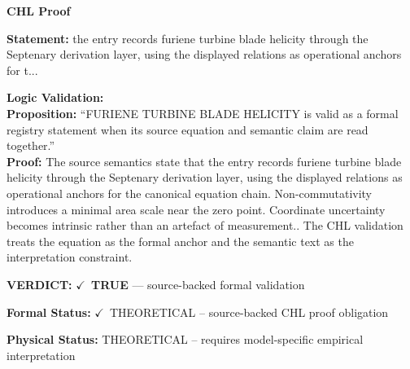 \vspace{0.45em}
\noindent\textbf{CHL Proof}\par
\textbf{Statement:} the entry records furiene turbine blade helicity through the Septenary derivation layer,
using the displayed relations as operational anchors for t...

\textbf{Logic Validation:}\\
\textbf{Proposition:} ``FURIENE TURBINE BLADE HELICITY is valid as a formal registry statement when its source
equation and semantic claim are read together.''\\
\textbf{Proof:} The source semantics state that the entry records furiene turbine blade helicity through
the Septenary derivation layer, using the displayed relations as operational anchors for
the canonical equation chain. Non-commutativity introduces a minimal area scale near the
zero point. Coordinate uncertainty becomes intrinsic rather than an artefact of
measurement.. The CHL validation treats the equation as the formal anchor and the
semantic text as the interpretation constraint.

\textbf{VERDICT:} \ensuremath{\checkmark}\ \textbf{TRUE} --- source-backed formal validation

\textbf{Formal Status:} \ensuremath{\checkmark}\ THEORETICAL -- source-backed CHL proof obligation

\textbf{Physical Status:} THEORETICAL -- requires model-specific empirical interpretation
\par\vspace{0.45em}
\par
\ifTZPDarkEdition
{}
\fi
\endgroup
\endgroup
